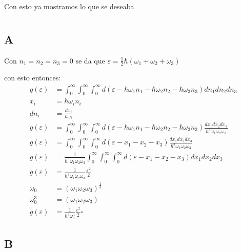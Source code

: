 \documentclass{report}
\begin{document}
Con esto ya mostramos lo que se deseaba

\chapter{}

\section{A}

Con $n_1 = n_2 = n_3 = 0$ se da que $\varepsilon = \frac{1}{2}\hbar (\omega_1 + \omega_2 + \omega_3)$

con esto entonces:
\begin{align*}
  g(\varepsilon) &= \int_0^\infty \int_0^\infty \int_0^\infty d(\varepsilon - \hbar \omega_1 n_1 - \hbar \omega_2 n_2 - \hbar \omega_3 n_3) dn_1 dn_2 dn_3\\
  x_i &= \hbar \omega_i n_i\\
  dn_i &= \frac{dx_i}{\hbar \omega_i}\\
  g(\varepsilon) &= \int_0^\infty \int_0^\infty \int_0^\infty d(\varepsilon - \hbar \omega_1 n_1 - \hbar \omega_2 n_2 - \hbar \omega_3 n_3) \frac{dx_1 dx_2 dx_3}{\hbar^3 \omega_1 \omega_2 \omega_3}\\
  g(\varepsilon) &= \int_0^\infty \int_0^\infty \int_0^\infty d(\varepsilon - x_1 - x_2 - x_3) \frac{dx_1 dx_2 dx_3}{\hbar^3 \omega_1 \omega_2 \omega_3}\\
  g(\varepsilon) &= \frac{1}{\hbar^3 \omega_1 \omega_2 \omega_3}\int_0^\infty \int_0^\infty \int_0^\infty d(\varepsilon - x_1 - x_2 - x_3) dx_1 dx_2 dx_3\\
  g(\varepsilon) &= \frac{1}{\hbar^3 \omega_1 \omega_2 \omega_3}\frac{\varepsilon^2}{2}\\
  \omega_0 &= (\omega_1 \omega_2 \omega_3)^{\frac{1}{3}}\\
  \omega_0^3 &= (\omega_1 \omega_2 \omega_3)\\
  g(\varepsilon) &= \frac{1}{\hbar^3 \omega_0^3}\frac{\varepsilon^2}{2}\square
\end{align*}

\section{B}
\end{document}
